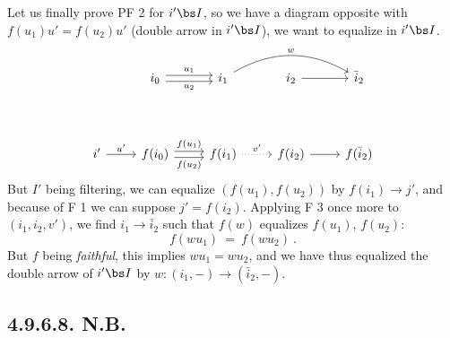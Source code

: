Let us finally prove PF 2 for $i'\bs I$, so we have a diagram opposite with $f(u_1)u' = f(u_2)u'$ (double arrow in $i'\bs I$), we want to equalize in $i'\bs I$.
\[
\begin{tikzcd}
{} & i_0 \arrow[r, shift left, "u_1"] \arrow[r, shift right, "u_2"'] & i_1 \arrow[rr, bend left, "w"] & i_2 \arrow[r] & \bar{i}_2 \\
{} & {} & {} & {} & {} \\
i' \arrow[r, "u'"] & f(i_0) \arrow[r, shift left, "f(u_1)"] \arrow[r, shift right, "f(u_2)"'] & f(i_1) \arrow[r, dotted, "v'"] & f(i_2) \arrow[r] & f(\bar{i}_2)
\end{tikzcd}
\]
But $I'$ being filtering, we can equalize $(f(u_1), f(u_2))$ by $f(i_1) \longrightarrow j'$, and because of F 1 we can suppose $j' = f(i_2)$. Applying F 3 once more to $(i_1, i_2, v')$, we find $i_1 \longrightarrow \bar{i}_2$ such that $f(w)$ equalizes $f(u_1)$, $f(u_2)$:
\[
f(wu_1) \ = \ f(wu_2) \ .
\]
But $f$ being \textit{faithful}, this implies $wu_1 = wu_2$, and we have thus equalized the double arrow of $i'\bs I$ by $w : (i_1, -) \longrightarrow (\bar{i}_2, -)$.

\subsection*{4.9.6.8. N.B.}

